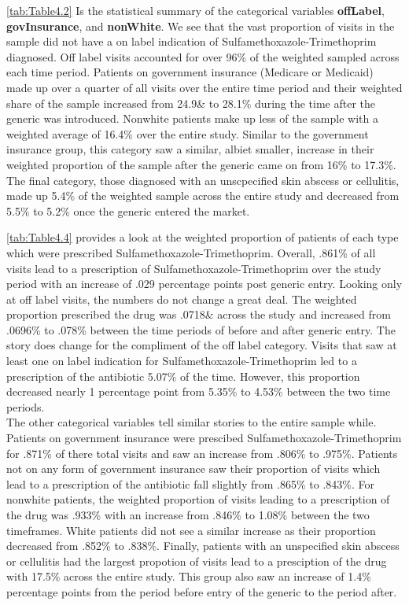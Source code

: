 \indent \autoref{tab:Table4.2} Is the statistical summary of the categorical variables \textbf{offLabel}, \textbf{govInsurance}, and \textbf{nonWhite}. We see that the vast proportion of visits in the sample did not have a on label indication of Sulfamethoxazole-Trimethoprim diagnosed. Off label visits accounted for over 96\% of the weighted sampled across each time period. Patients on government insurance (Medicare or Medicaid) made up over a quarter of all visits over the entire time period and their weighted share of the sample increased from 24.9\& to 28.1\% during the time after the generic was introduced. Nonwhite patients make up less of the sample with a weighted average of 16.4\% over the entire study. Similar to the government insurance group, this category saw a similar, albiet smaller, increase in their weighted proportion of the sample after the generic came on from 16\% to 17.3\%. The final category, those diagnosed with an unscpecified skin abscess or cellulitis, made up 5.4\% of the weighted sample across the entire study and decreased from 5.5\% to 5.2\% once the generic entered the market.
\begin{landscape}

\end{landscape} 
\begin{landscape}

\end{landscape}
\autoref{tab:Table4.4} provides a look at the weighted proportion of patients of each type which were prescribed Sulfamethoxazole-Trimethoprim. Overall, .861\% of all visits lead to a prescription of Sulfamethoxazole-Trimethoprim over the study period with an increase of .029 percentage points post generic entry. Looking only at off label visits, the numbers do not change a great deal. The weighted proportion prescribed the drug was .0718\& across the study and increased from .0696\% to .078\% between the time periods of before and after generic entry. The story does change for the compliment of the off label category. Visits that saw at least one on label indication for Sulfamethoxazole-Trimethoprim led to a prescription of the antibiotic 5.07\% of the time. However, this proportion decreased nearly 1 percentage point from 5.35\% to 4.53\% between the two time periods.\\
\indent The other categorical variables tell similar stories to the entire sample while. Patients on government insurance were prescibed Sulfamethoxazole-Trimethoprim for .871\% of there total visits and saw an increase from .806\% to .975\%. Patients not on any form of government insurance saw their proportion of visits which lead to a prescription of the antibiotic fall slightly from .865\% to .843\%. For nonwhite patients, the weighted proportion of visits leading to a prescription of the drug was .933\% with an increase from .846\% to 1.08\% between the two timeframes. White patients did not see a similar increase as their proportion decreased from .852\% to .838\%. Finally, patients with an unspecified skin abscess or cellulitis had the largest propotion of visits lead to a presciption of the drug with 17.5\% across the entire study. This group also saw an increase of 1.4\% percentage points from the period before entry of the generic to the period after. 
\begin{landscape}

\end{landscape}